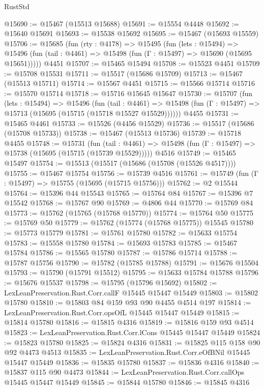 \begin{lexlean}{RustStd}
\begin{coremodule}
@15690 := @15467 (@15513 @15688)
@15691 := @15554 @4448
@15692 := @15640 @15691
@15693 := @15538 @15692
@15695 := @15467 (@15693 @15559)
@15706 := @15685
    (fun (rty : @4178) =>
    @15495
      (fun (lets : @15494) =>
      @15496 (fun (tail : @4461) => @15498 (fun (Γ : @15497) => @15690 (@15695 @15651)))))
    @4451
@15707 := @15465 @15494
@15708 := @15523 @4451
@15709 := @15708 @15531
@15711 := @15517 (@15686 @15709)
@15713 := @15467 (@15513 @15711)
@15714 := @15567 @4451
@15715 := @15566 @15714
@15716 := @15570 @15714
@15718 := @15716 @15645 @15647
@15730 := @15707
    (fun (lets : @15494) =>
    @15496
      (fun (tail : @4461) =>
      @15498 (fun (Γ : @15497) => @15713 (@15695 (@15715 (@15718 @15527 @15529))))))
    @4455
@15731 := @15465 @4461
@15733 := @15526 (@4456 @15529)
@15736 := @15517 (@15686 (@15708 @15733))
@15738 := @15467 (@15513 @15736)
@15739 := @15718 @4455
@15748 := @15731
    (fun (tail : @4461) => @15498 (fun (Γ : @15497) => @15738 (@15695 (@15715 (@15739 @15529)))))
    @4516
@15749 := @15465 @15497
@15754 := @15513 (@15517 (@15686 (@15708 (@15526 @4517))))
@15755 := @15467 @15754
@15756 := @15739 @4516
@15761 := @15749 (fun (Γ : @15497) => @15755 (@15695 (@15715 @15756)))
@15762 := @2 @15544
@15764 := @15396 @44 @15543
@15765 := @15764 @84
@15767 := @15396 @7 @15542
@15768 := @15767 @90
@15769 := @4806 @44
@15770 := @15769 @84
@15773 := @15762 (@15765 (@15768 @15770))
@15774 := @15764 @50
@15775 := @15769 @50
@15779 := @15762 (@15774 (@15768 @15775)) @15545
@15780 := @15773 @15779
@15781 := @15761 @15780
@15782 := @15633 @15754
@15783 := @15558 @15780
@15784 := @15693 @15783
@15785 := @15467 @15784
@15786 := @15565 @15780
@15787 := @15786 @15714
@15788 := @15787 @15756
@15790 := @15782 (@15785 @15788)
@15791 := @15676 @15504
@15793 := @15790 (@15791 @15512)
@15795 := @15633 @15784 @15788
@15796 := @15676 @15537
@15798 := @15795 (@15796 @15692)
@15802 := LexLeanPreservation.Rust.Corr.callF @15445 @15447 @15449
@15803 := @15802 @15780
@15810 := @15803 @84 @159 @93 @90 @4455 @4514 @197
@15814 := LexLeanPreservation.Rust.Corr.opsOfL @15445 @15447 @15449
@15815 := @15814 @15780
@15816 := @15815 @4316
@15819 := @15816 @159 @93 @4514
@15823 := LexLeanPreservation.Rust.Corr.lCons @15445 @15447 @15449
@15824 := @15823 @15780
@15825 := @15824 @4316
@15831 := @15825 @115 @158 @90 @92 @4473 @4513
@15835 := LexLeanPreservation.Rust.Corr.eOfBNil @15445 @15447 @15449
@15836 := @15835 @15780
@15837 := @15836 @4316
@15840 := @15837 @115 @90 @4473
@15844 := LexLeanPreservation.Rust.Corr.callOps @15445 @15447 @15449
@15845 := @15844 @15780
@15846 := @15845 @4316

\end{coremodule}
\end{lexlean}
